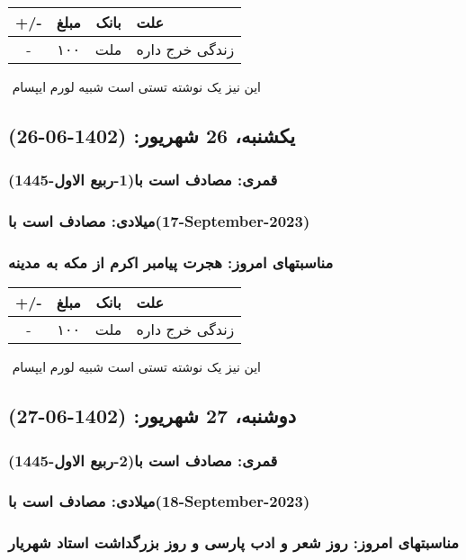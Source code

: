 \documentclass{article}
\newcommand{\rnote}[1]{\marginpar{\textcolor{color}{\StrSubstitute{\##1}{ }{\_}}}}
\newcommand{\myRow}[4]{
    #1 & #2 & #3 & #4 \\ \hline
}
\begin{document}
\begin{tabular}{ | c | c | c | p{5cm} |}
    \hline
    \myRow{ +/- }{مبلغ}{بانک}{علت}
    \myRow{-}{۱۰۰}{ملت}{زندگی خرج داره}
\end{tabular}
\newline
\newline

‌
\rnote{تست}
این نیز یک نوشته تستی است شبیه لورم ایپسام




\newpage
{}
\textcolor{color}{
\section{ یکشنبه، 26 شهریور: (1402-06-26) }
\subsubsection*{قمری: مصادف است با(1-ربیع الاول-1445)} 
\subsubsection*{میلادی: مصادف است با(17-September-2023)}
\subsubsection*{مناسبتهای امروز: هجرت پیامبر اکرم از مکه به مدینه}
}


\begin{tabular}{ | c | c | c | p{5cm} |}
    \hline
    \myRow{ +/- }{مبلغ}{بانک}{علت}
    \myRow{-}{۱۰۰}{ملت}{زندگی خرج داره}
\end{tabular}
\newline
\newline

‌
\rnote{تست}
این نیز یک نوشته تستی است شبیه لورم ایپسام




\newpage
{}
\textcolor{color}{
\section{ دوشنبه، 27 شهریور: (1402-06-27) }
\subsubsection*{قمری: مصادف است با(2-ربیع الاول-1445)} 
\subsubsection*{میلادی: مصادف است با(18-September-2023)}
\subsubsection*{مناسبتهای امروز: روز شعر و ادب پارسی و روز بزرگداشت استاد شهریار}
}
\end{document}
